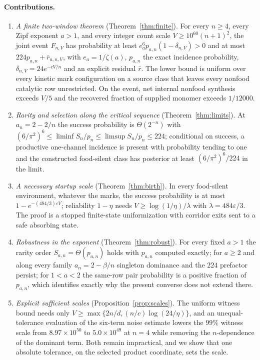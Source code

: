 \documentclass[11pt,letterpaper]{article}
\theoremstyle{plain}
\theoremstyle{definition}
\theoremstyle{remark}
\numberwithin{equation}{section}
\newcommand{\eps}{\varepsilon}
\begin{document}
\paragraph{Contributions.}
\begin{enumerate}[label=(\roman*)]
\item \emph{A finite two-window theorem} (Theorem~\ref{thm:finite}). For every $n\ge4$, every Zipf exponent $a>1$, and every integer count scale $V\ge10^{60}(n+1)^2$, the joint event $F_{n,V}$ has probability at least $e_a^6p_{a,n}(1-\delta_{n,V})>0$ and at most $224p_{a,n}+\bar r_{a,n,V}$, with $e_a=1/\zeta(a)$, $p_{a,n}$ the exact incidence probability, $\delta_{n,V}=24e^{-cV/n}$ and an explicit residual $\bar r$. The lower bound is uniform over every kinetic mark configuration on a source class that leaves every nonfood catalytic row unrestricted. On the event, net internal nonfood synthesis exceeds $V/5$ and the recovered fraction of supplied monomer exceeds $1/12000$.
\item \emph{Rarity and selection along the critical sequence} (Theorem~\ref{thm:limits}). At $a_n=2-2/n$ the success probability is $\Theta(2^{-n})$ with $(6/\pi^2)^6\le\liminf S_n/p_n\le\limsup S_n/p_n\le224$; conditional on success, a productive one-channel incidence is present with probability tending to one and the constructed food-silent class has posterior at least $(6/\pi^2)^6/224$ in the limit.
\item \emph{A necessary startup scale} (Theorem~\ref{thm:birth}). In every food-silent environment, whatever the marks, the success probability is at most $1-e^{-(484/3)\eps V}$; reliability $1-\eta$ needs $V\ge\log(1/\eta)/\lambda$ with $\lambda=484\eps/3$. The proof is a stopped finite-state uniformization with corridor exits sent to a safe absorbing state.
\item \emph{Robustness in the exponent} (Theorem~\ref{thm:robust}). For every fixed $a>1$ the rarity order $S_{a,n}=\Theta(p_{a,n})$ holds with $p_{a,n}$ computed exactly; for $a\ge2$ and along every family $a_n=2-\beta/n$ singleton dominance and the $224$ prefactor persist; for $1<a<2$ the same-row pair probability is a positive fraction of $p_{a,n}$, which identifies exactly why the present converse does not extend there.
\item \emph{Explicit sufficient scales} (Proposition~\ref{prop:scales}). The uniform witness bound needs only $V\ge\max\{2n/d,(n/c)\log(24/\eta)\}$, and an unequal-tolerance evaluation of the six-term noise estimate lowers the $99\%$ witness scale from $8.97\times10^{50}$ to $5.0\times10^{49}$ at $n=4$ while removing the $n$-dependence of the dominant term. Both remain impractical, and we show that one absolute tolerance, on the selected product coordinate, sets the scale.

\end{enumerate}
\end{document}

